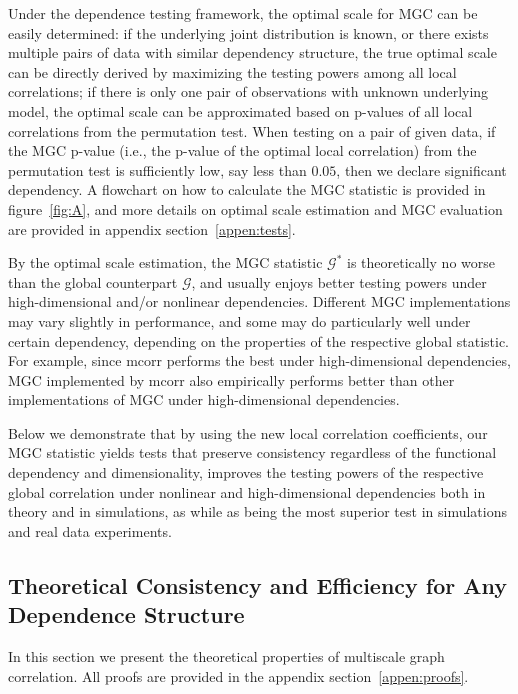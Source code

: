 \documentclass[11pt]{article}
\newcommand{\G}{\mathcal{G}}
\begin{document}
Under the dependence testing framework, the optimal scale for MGC can be easily determined: if the underlying joint distribution is known, or there exists multiple pairs of data with similar dependency structure, the true optimal scale can be directly derived by maximizing the testing powers among all local correlations; if there is only one pair of observations with unknown underlying model, the optimal scale can be approximated based on p-values of all local correlations from the permutation test. When testing on a pair of given data, if the MGC p-value (i.e., the p-value of the optimal local correlation) from the permutation test is sufficiently low, say less than $0.05$, then we declare significant dependency. A flowchart on how to calculate the MGC statistic is provided in figure~\ref{fig:A}, and more details on optimal scale estimation and MGC evaluation are provided in appendix section~\ref{appen:tests}.

By the optimal scale estimation, the MGC statistic $\G^{*}$ is theoretically no worse than the global counterpart $\G$, and usually enjoys better testing powers under high-dimensional and/or nonlinear dependencies. Different MGC implementations may vary slightly in performance, and some may do particularly well under certain dependency, depending on the properties of the respective global statistic. For example, since mcorr performs the best under high-dimensional dependencies, MGC implemented by mcorr also empirically performs better than other implementations of MGC under high-dimensional dependencies. 

Below we demonstrate that by using the new local correlation coefficients, our MGC statistic yields tests that preserve consistency regardless of the functional dependency and dimensionality, improves the testing powers of the respective global correlation under nonlinear and high-dimensional dependencies both in theory and in simulations, as while as being the most superior test in simulations and real data experiments.


\subsection{Theoretical Consistency and Efficiency for Any Dependence Structure}
\label{main2}
In this section we present the theoretical properties of multiscale graph correlation. All proofs are provided in the appendix section~\ref{appen:proofs}. 
\end{document}
